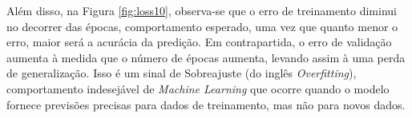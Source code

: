 Além disso, na Figura \ref{fig:loss10}, observa-se que o erro de treinamento diminui no decorrer das épocas, comportamento esperado, uma vez que quanto menor o erro, maior será a acurácia da predição. Em contrapartida, o erro de validação aumenta à medida que o número de épocas aumenta, levando assim à uma perda de generalização. Isso é um sinal de Sobreajuste (do inglês \textit{Overfitting}), comportamento indesejável de \textit{Machine Learning} que ocorre quando o modelo fornece previsões precisas para dados de treinamento, mas não para novos dados.






